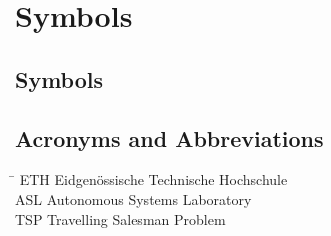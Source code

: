 \chapter*{Symbols}
\label{sec:symbols}

\section*{Symbols}



\section*{Acronyms and Abbreviations}
\begin{tabbing}
 \hspace*{1.6cm}  \= \kill
 ETH \> Eidgen\"ossische Technische Hochschule \\[0.5ex]
 ASL \> Autonomous Systems Laboratory \\[0.5ex]
 TSP \> Travelling Salesman Problem \\[0.5ex]
\end{tabbing}